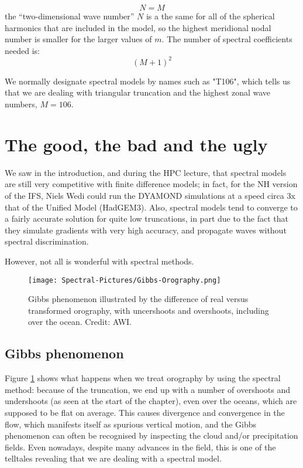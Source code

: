 \begin{definition}
	\begin{equation}
		N = M
	\end{equation}
	the “two-dimensional wave number” $N$ is a the same for all of the spherical harmonics that are included in the model, so the highest meridional nodal number is smaller for the larger values of $m$.
	The number of spectral coefficients needed is:
	\begin{equation}
		(M+1)^2
	\end{equation}
\end{definition}

We normally designate spectral models by names such as "T106", which tells us that we are dealing with triangular truncation and the highest zonal wave numbers, $M=106$.

\section{The good, the bad and the ugly}
We saw in the introduction, and during the HPC lecture, that spectral models are still very competitive with finite difference models; in fact, for the NH version of the IFS, Niels Wedi could run the DYAMOND simulations at a speed circa 3x that of the Unified Model (HadGEM3). Also, spectral models tend to converge to a fairly accurate solution for quite low truncations, in part due to the fact that they simulate gradients with very high accuracy, and propagate waves without spectral discrimination.

However, not all is wonderful with spectral methods.

\begin{figure}[h!]
	\begin{center}
		\texttt{[image: Spectral-Pictures/Gibbs-Orography.png]}
	\end{center}
	\label{fig:GIbbs}
	\caption{Gibbs phenomenon illustrated by the difference of real versus transformed orography, with uncershoots and overshoots, including over the ocean. Credit: AWI.}
\end{figure}

\subsection{Gibbs phenomenon}
Figure \ref{fig:GIbbs} shows what happens when we treat orography by using the spectral method: because of the truncation, we end up with a number of overshoots and undershoots (as seen at the start of the chapter), even over the oceans, which are supposed to be flat on average. This causes divergence and convergence in the flow, which manifests itself as spurious vertical motion, and the Gibbs phenomenon can often be recognised by inspecting the cloud and/or precipitation fields. Even nowadays, despite many advances in the field, this is one of the telltales revealing that we are dealing with a spectral model.


